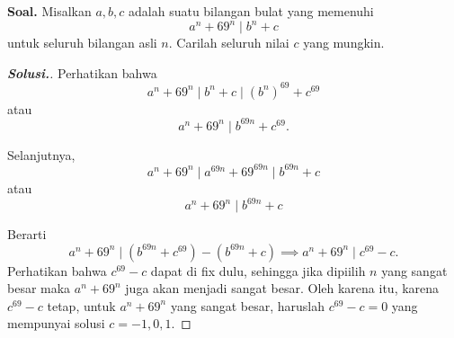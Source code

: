 \documentclass[12pt]{scrartcl}
\author{Soal Esai Nomor 2 KTOM Oktober 2021}
\date{Official solution by Azzam L. H.}
\begin{document}
\maketitle


 \textbf{Soal.} Misalkan $a,b,c$ adalah suatu bilangan bulat yang memenuhi 
 	$$a^n + 69^n \mid b^n + c$$ untuk seluruh bilangan asli $n$. Carilah seluruh nilai $c$ yang mungkin.
 	\newpage
 	\begin{proof}[\textbf{Solusi.}]
 	 Perhatikan bahwa \[a^n+69^n \mid b^{n}+c \mid (b^n)^{69}+c^{69}\] atau \[a^n + 69^n \mid b^{69n}+c^{69}.\]
 		
 		Selanjutnya, \[a^n+69^n \mid a^{69n} + 6 9^{69n}\mid b^{69n} + c\] atau \[ a^n+69^n \mid b^{69n} + c\]
 		
 		Berarti 
 		\[a^n+69^n \mid (b^{69n}+c^{69})-(b^{69n} + c) \implies a^n+69^n \mid c^{69}-c.\]
 		Perhatikan bahwa $c^{69}-c$ dapat di fix dulu, sehingga jika dipiilih $n$ yang sangat besar maka $a^n+69^n$ juga akan menjadi sangat besar. Oleh karena itu, karena $c^{69}-c$ tetap, untuk $a^n+69^n$ yang sangat besar, haruslah $c^{69}-c=0$ yang mempunyai solusi $c=\boxed{-1,0,1}$.
 	\end{proof}
\end{document}
